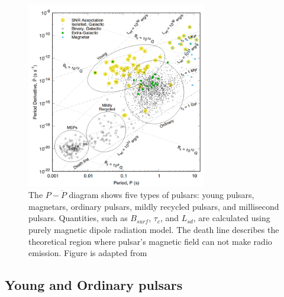 \documentclass[thesis_msc.tex]{subfiles}
\begin{document}
        \begin{figure}[h] \centering \includegraphics[width=0.7\textwidth]{figures/P-pdot.png}
\caption{ The $P- \dot{P}$ diagram shows five types of pulsars: young pulsars, magnetars,  ordinary pulsars, mildly recycled pulsars, and millisecond pulsars. Quantities, such as $B_{surf}$, $\tau_c$, and $L_{sd}$, are calculated using purely magnetic dipole radiation model.  The death line describes the theoretical region where pulsar's magnetic field can not make radio emission. Figure  is adapted from \cite{Alex}}
\label{ppdot}
\end{figure}

\subsection{Young and Ordinary pulsars}
\end{document}

